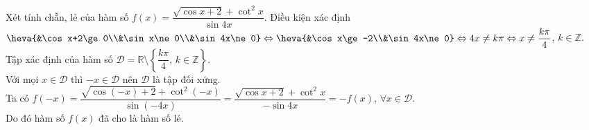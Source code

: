 \begin{bt}%
	Xét tính chẵn, lẻ của hàm số $f(x)=\dfrac{\sqrt{\cos x+2}+\cot^2 x}{\sin 4x}$.
	\loigiai
	{
		Điều kiện xác định $\heva{&\cos x+2\ge 0\\&\sin x\ne 0\\&\sin 4x\ne 0}\Leftrightarrow\heva{&\cos x\ge -2\\&\sin 4x\ne 0}\Leftrightarrow 4x\ne k\pi\Leftrightarrow x\ne\dfrac{k\pi}{4}$, $k\in\mathbb{Z}$.\\
		Tập xác định của hàm số $\mathscr{D}=\mathbb{R}\setminus\left\{\dfrac{k\pi}{4},\,k\in\mathbb{Z}\right\}$.\\
		Với mọi $x\in\mathscr{D}$ thì $-x\in\mathscr{D}$ nên $\mathscr{D}$ là tập đối xứng.\\
		Ta có $f(-x)=\dfrac{\sqrt{\cos(-x)+2}+\cot^2(-x)}{\sin(-4x)}=\dfrac{\sqrt{\cos x+2}+\cot^2 x}{-\sin 4x}=-f(x)$, $\forall x\in\mathscr{D}$.\\
		Do đó hàm số $f(x)$ đã cho là hàm số lẻ.
	}
\end{bt}